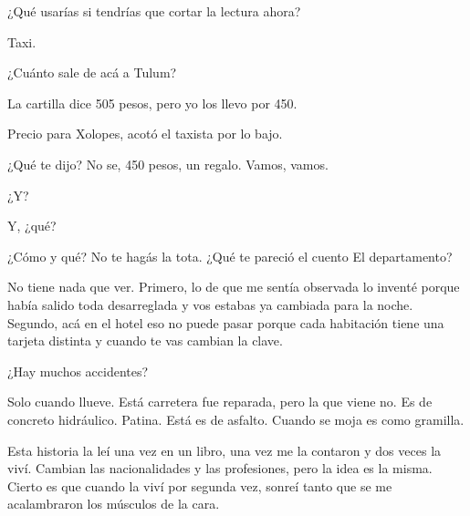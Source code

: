 \documentclass[11pt,twoside,openright,a6paper]{book}
\begin{document}
¿Qué usarías si tendrías que cortar la lectura ahora?


\vspace{0.5cm}
\hrulefill\hspace{0.2cm} \decofourleft\decofourright \hspace{0.2cm} \hrulefill
\vspace{0.5cm}

Taxi.

¿Cuánto sale de acá a Tulum?

La cartilla dice 505 pesos, pero yo los llevo por 450.

Precio para Xolopes, acotó el taxista por lo bajo.

¿Qué te dijo? No se, 450 pesos, un regalo. Vamos, vamos.


\vspace{0.5cm}
\hrulefill\hspace{0.2cm} \decofourleft\decofourright \hspace{0.2cm} \hrulefill
\vspace{0.5cm}

¿Y?

Y, ¿qué?

¿Cómo y qué? No te hagás la tota. ¿Qué te pareció el cuento El
departamento?

No tiene nada que ver. Primero, lo de que me sentía observada lo inventé
porque había salido toda desarreglada y vos estabas ya cambiada para la
noche. Segundo, acá en el hotel eso no puede pasar porque cada habitación
tiene una tarjeta distinta y cuando te vas cambian la clave.


\vspace{0.5cm}
\hrulefill\hspace{0.2cm} \decofourleft\decofourright \hspace{0.2cm} \hrulefill
\vspace{0.5cm}

¿Hay muchos accidentes?

Solo cuando llueve. Está carretera fue reparada, pero la que viene no. Es
de concreto hidráulico. Patina. Está es de asfalto. Cuando se moja es
como gramilla.


\vspace{0.5cm}
\hrulefill\hspace{0.2cm} \decofourleft\decofourright \hspace{0.2cm} \hrulefill
\vspace{0.5cm}

Esta historia la leí una vez en un libro, una vez me la contaron y dos
veces la viví. Cambian las nacionalidades y las profesiones, pero la idea
es la misma. Cierto es que cuando la viví por segunda vez, sonreí tanto
que se me acalambraron los músculos de la cara.
\end{document}
